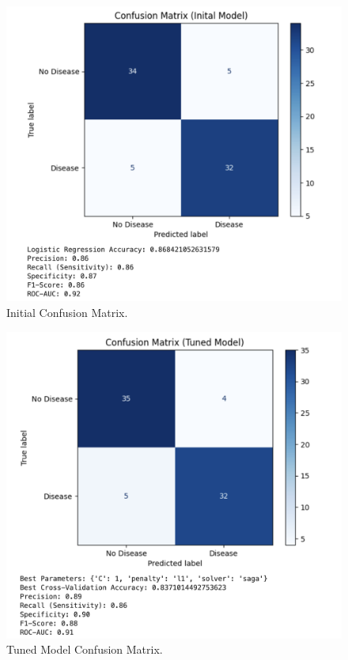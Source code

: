 \begin{figure}[htbp]
    \centerline{\includegraphics[scale=0.2]{img/Confusion Matrix Inital.png}}
    \caption{Initial Confusion Matrix.}\label{agedist}
\end{figure}

\begin{figure}[htbp]
    \centerline{\includegraphics[scale=0.2]{img/Confusion Matrix Tuned Model.png}}
    \caption{Tuned Model Confusion Matrix.}\label{agedist}
\end{figure}

